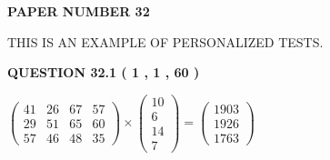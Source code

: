 \documentclass[12pt]{article}
\begin{document}
   
   
   
 {\textbf{ \Large{ PAPER NUMBER  32  }}}
   
   
\vspace{0.2in}
   
   
   
   
   
   
 \vspace{0.2in}
{\Huge  THIS IS AN EXAMPLE OF}
{\Huge  PERSONALIZED TESTS. }
   
   
  
\vspace{0.2in}
  
{\textbf{\Large{QUESTION
32.1 
 ( 1 , 1 , 60 )
}}}
  
  
 
 
\noindent{}

 
$\left( \begin{array}{ccccccccccccccc}
 41  & 
 26  & 
 67  & 
 57  \\ 
 29  & 
 51  & 
 65  & 
 60  \\ 
 57  & 
 46  & 
 48  & 
 35
\end{array}\right) \times
\left( \begin{array}{c}
 10  \\ 
 6  \\ 
 14  \\ 
 7
\end{array}\right)  =
\left( \begin{array}{c}
 1903  \\ 
 1926  \\ 
 1763
\end{array}\right)  $
 
\end{document}
